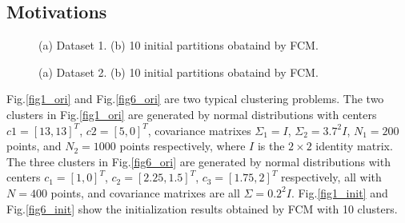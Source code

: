 \documentclass[journal]{IEEEtran}
\theoremstyle{definition}
\begin{document}
\subsection{Motivations}
\label{sec-2-2}
\begin{figure}[!t]
   \centering
\caption{(a) Dataset 1. (b) 10 initial partitions obataind by FCM.}
\label{fig1}
\end{figure}
\begin{figure}[!t]
   \centering
\caption{(a) Dataset 2. (b) 10 initial partitions obataind by FCM.}
\label{fig6}
\end{figure}
Fig.\ref{fig1_ori} and Fig.\ref{fig6_ori} are two typical clustering problems. The two clusters in Fig.\ref{fig1_ori} are generated by normal distributions with centers $c1=[13, 13]^T$, $c2=[5, 0]^T$, covariance matrixes $\Sigma_1=I$, $\Sigma_2=3.7^2I$, $N_1=200$ points, and $N_2=1000$ points  respectively, where $I$ is the $2\times 2$ identity matrix. The three clusters in Fig.\ref{fig6_ori} are generated by normal distributions with  centers $c_1=[1, 0]^T$, $c_2=[2.25, 1.5]^T$, $c_3=[1.75, 2]^T$ respectively, all with $N=400$ points, and covariance matrixes are all $\Sigma=0.2^2I$. Fig.\ref{fig1_init} and Fig.\ref{fig6_init} show the initialization results obtained by FCM with 10 clusters.
\end{document}

